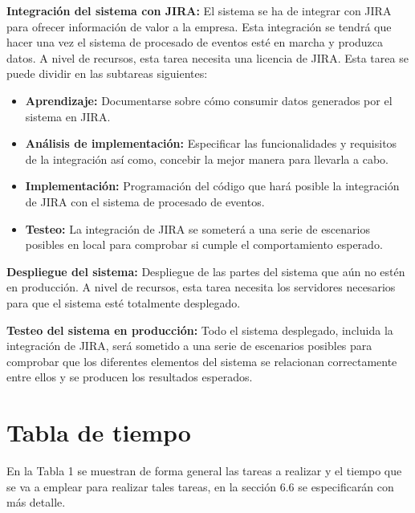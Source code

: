 \textbf{Integración del sistema con JIRA:} El sistema se ha de integrar con JIRA para ofrecer información de valor a la empresa. Esta integración se tendrá que hacer una vez el sistema de procesado de eventos esté en marcha y produzca datos. A nivel de recursos, esta tarea necesita una licencia de JIRA. Esta tarea se puede dividir en las subtareas siguientes:
\begin{itemize}
	
	\item \textbf{Aprendizaje:} Documentarse sobre cómo consumir datos generados por el sistema en JIRA.
	
	\item \textbf{Análisis de implementación:} Especificar las funcionalidades y requisitos de la integración así como, concebir la mejor manera para llevarla a cabo.
	
	\item \textbf{Implementación:} Programación del código que hará posible la integración de JIRA con el sistema de procesado de eventos.
	
	\item \textbf{Testeo:} La integración de JIRA se someterá a una serie de escenarios posibles en local para comprobar si cumple el comportamiento esperado.
	
\end{itemize}

\textbf{Despliegue del sistema:} Despliegue de las partes del sistema que aún no estén en producción. A nivel de recursos, esta tarea necesita los servidores necesarios para que el sistema esté totalmente desplegado.

\textbf{Testeo del sistema en producción:} Todo el sistema desplegado, incluida la integración de JIRA, será sometido a una serie de escenarios posibles para comprobar que los diferentes elementos del sistema se relacionan correctamente entre ellos y se producen los resultados esperados.

\section{Tabla de tiempo}
En la Tabla 1 se muestran de forma general las tareas a realizar y el tiempo que se va a emplear para realizar tales tareas, en la sección 6.6 se especificarán con más detalle.

